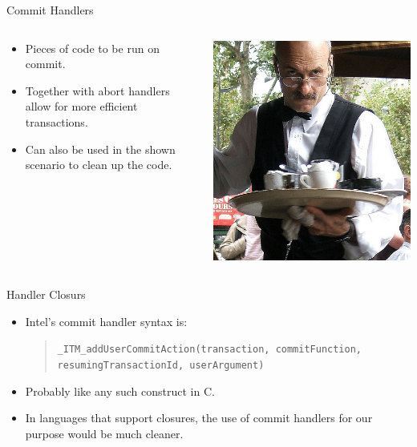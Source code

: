 \documentclass[]{beamer}
\begin{document}
\begin{frame}{Commit Handlers}
\begin{columns}
\begin{column}{8cm}
\begin{itemize}
\item Pieces of code to be run on commit.
\item Together with abort handlers allow for more efficient transactions.
\item Can also be used in the shown scenario to clean up the code.
\end{itemize}
\end{column}
\begin{column}{3cm}
\includegraphics[width=\textwidth]{waiter.jpg}
\end{column}
\end{columns}
\end{frame}

\begin{frame}{Handler Closurs}
\begin{itemize}
\item Intel's commit handler syntax is: \begin{quote}
{\tt \_ITM\_addUserCommitAction(transaction, 
        commitFunction, 
        resumingTransactionId, 
        userArgument)
}
\end{quote}
\item Probably like any such construct in C.
\item In languages that support closures, the use of commit handlers for our
      purpose would be much cleaner.  
\end{itemize}
\end{frame}
\end{document}
